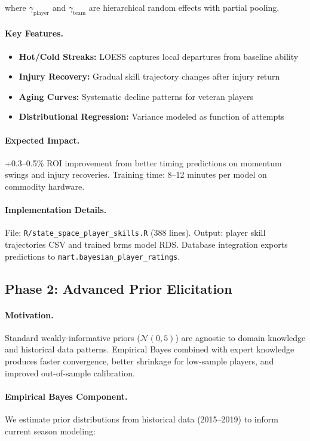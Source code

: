 \documentclass[12pt]{report}  %
\numberwithin{equation}{section}
\theoremstyle{plain}
\theoremstyle{definition}
\theoremstyle{remark}
\begin{document}
where $\gamma_{\text{player}}$ and $\gamma_{\text{team}}$ are hierarchical random effects with partial pooling.

\paragraph{Key Features.}
\begin{itemize}
  \item \textbf{Hot/Cold Streaks:} LOESS captures local departures from baseline ability
  \item \textbf{Injury Recovery:} Gradual skill trajectory changes after injury return
  \item \textbf{Aging Curves:} Systematic decline patterns for veteran players
  \item \textbf{Distributional Regression:} Variance modeled as function of attempts
\end{itemize}

\paragraph{Expected Impact.}
+0.3--0.5\% ROI improvement from better timing predictions on momentum swings and injury recoveries. Training time: 8--12 minutes per model on commodity hardware.

\paragraph{Implementation Details.}
File: \texttt{R/state\_space\_player\_skills.R} (388 lines). Output: player skill trajectories CSV and trained brms model RDS. Database integration exports predictions to \texttt{mart.bayesian\_player\_ratings}.

\subsection{Phase 2: Advanced Prior Elicitation}

\paragraph{Motivation.}
Standard weakly-informative priors ($\mathcal{N}(0, 5)$) are agnostic to domain knowledge and historical data patterns. Empirical Bayes combined with expert knowledge produces faster convergence, better shrinkage for low-sample players, and improved out-of-sample calibration.

\paragraph{Empirical Bayes Component.}
We estimate prior distributions from historical data (2015--2019) to inform current season modeling:
\end{document}
